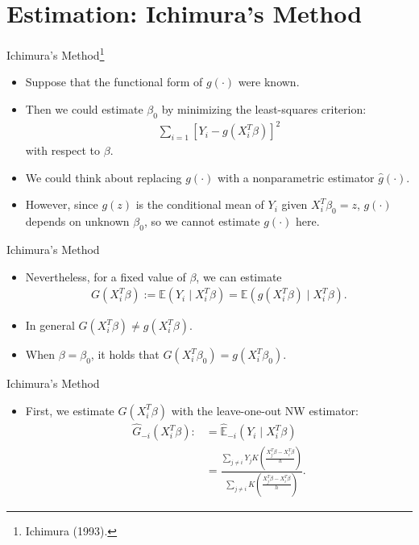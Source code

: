 \documentclass[xcolor=svgnames,dvipdfmx,cjk]{beamer}
\theoremstyle{example}
\begin{document}
\section{Estimation: Ichimura's Method}


\begin{frame}{Ichimura's Method\footnote{Ichimura (1993).}}
\begin{itemize}
  \item Suppose that the functional form of $g(\cdot)$ were known.
  \item Then we could estimate $\beta_0$ by minimizing the least-squares criterion:
        \begin{align*}
        \sum_{i=1} \left[ Y_i - g(X_i^{T}\beta) \right]^2
        \end{align*}
        with respect to $\beta$.
  \item We could think about replacing $g(\cdot)$ with a nonparametric estimator $\hat{g}(\cdot)$.
  \item However, since $g(z)$ is the conditional mean of $Y_i$ given $X_i^{T} \beta_0 = z$,
        \alert{$g(\cdot)$ depends on unknown $\beta_0$}, so we cannot estimate $g(\cdot)$ here.
\end{itemize}
\end{frame}

\begin{frame}{Ichimura's Method}
\begin{itemize}
  \item Nevertheless, \alert{for a fixed value of $\beta$}, we can estimate
        \begin{align*}
        G(X_i^{T} \beta) 
          := \mathbb{E} (Y_i \mid X_i^{T}\beta) 
           = \mathbb{E} (g(X_i^{T}\beta) \mid X_i^{T}\beta).
        \end{align*}
  \item In general $G(X_i^{T}\beta) \neq g(X_i^{T} \beta)$.
  \item When $\beta = \beta_0$,
        it holds that $G(X_i^{T}\beta_0) = g(X_i^{T} \beta_0)$. 
\end{itemize}  
\end{frame}

\begin{frame}{Ichimura's Method}
  \begin{itemize}
  \item First, we estimate $G(X_i^{T}\beta)$  
        with the leave-one-out NW estimator:
        \begin{align*}
          \hat{G}_{-i}(X_i^{T}\beta) 
              :&= \hat{\mathbb{E}}_{-i}(Y_i \mid X_i^{T} \beta) \\
               &= \frac
                  {\sum_{j \neq i} Y_j 
                   K \left( \frac
                            {X_j^{T}\beta - X_i^{T}\beta}
                            {h} 
                     \right) 
                  }
                  {\sum_{j \neq i} 
                   K \left( \frac
                           {X_j^{T}\beta - X_i^{T}\beta}
                           {h} 
                     \right) 
                  }.
        \end{align*}
\end{itemize}
\end{frame}
\end{document}
